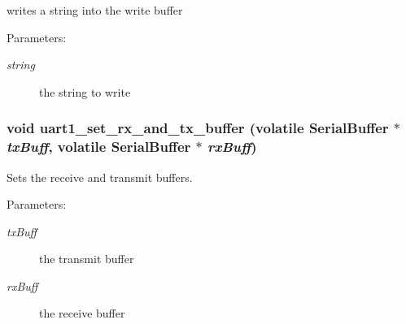 writes a string into the write buffer 

\begin{Desc}
\item[Parameters:]
\begin{description}
\item[{\em string}]the string to write \end{description}
\end{Desc}
\hypertarget{group___u_a_r_t_gd48c3413dab488fe3579ebcbee2466c7}{
\subsubsection[{uart1\_\-set\_\-rx\_\-and\_\-tx\_\-buffer}]{\setlength{\rightskip}{0pt plus 5cm}void uart1\_\-set\_\-rx\_\-and\_\-tx\_\-buffer (volatile {\bf SerialBuffer} $\ast$ {\em txBuff}, \/  volatile {\bf SerialBuffer} $\ast$ {\em rxBuff})}}
\label{group___u_a_r_t_gd48c3413dab488fe3579ebcbee2466c7}


Sets the receive and transmit buffers. 

\begin{Desc}
\item[Parameters:]
\begin{description}
\item[{\em txBuff}]the transmit buffer \item[{\em rxBuff}]the receive buffer \end{description}
\end{Desc}
